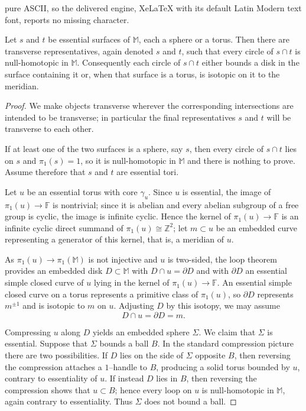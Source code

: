 \documentclass[10pt,a4paper]{amsart}
\newcommand{\FF}{\mathbb{F}}
\newcommand{\MM}{\mathbb{M}}
\newcommand{\ZZ}{\mathbb{Z}}
\begin{document}
pure ASCII, so the delivered engine, XeLaTeX with its default Latin Modern text font, reports no missing character.
\begin{lemma} \label{lem:circle_types}
    Let $s$ and $t$ be essential surfaces of $\MM$, each a sphere or a torus.
    Then there are transverse representatives, again denoted $s$ and $t$, such that every circle of $s \cap t$ is null-homotopic in $\MM$.
    Consequently each circle of $s \cap t$ either bounds a disk in the surface containing it or, when that surface is a torus, is isotopic on it to the meridian.
\end{lemma}

\begin{proof}
    We make objects transverse wherever the corresponding intersections are intended to be transverse; in particular the final representatives $s$ and $t$ will be transverse to each other.

    If at least one of the two surfaces is a sphere, say $s$, then every circle of $s \cap t$ lies on $s$ and $\pi_1(s) = 1$, so it is null-homotopic in $\MM$ and there is nothing to prove.
    Assume therefore that $s$ and $t$ are essential tori.

    Let $u$ be an essential torus with core $\gamma_u$.
    Since $u$ is essential, the image of $\pi_1(u) \to \FF$ is nontrivial; since it is abelian and every abelian subgroup of a free group is cyclic, the image is infinite cyclic.
    Hence the kernel of $\pi_1(u) \to \FF$ is an infinite cyclic direct summand of $\pi_1(u) \cong \ZZ^2$; let $m \subset u$ be an embedded curve representing a generator of this kernel, that is, a meridian of $u$.

    As $\pi_1(u) \to \pi_1(\MM)$ is not injective and $u$ is two-sided, the loop theorem provides an embedded disk $D \subset \MM$ with $D \cap u = \partial D$ and with $\partial D$ an essential simple closed curve of $u$ lying in the kernel of $\pi_1(u) \to \FF$.
    An essential simple closed curve on a torus represents a primitive class of $\pi_1(u)$, so $\partial D$ represents $m^{\pm 1}$ and is isotopic to $m$ on $u$.
    Adjusting $D$ by this isotopy, we may assume
    \[
        D \cap u = \partial D = m .
    \]

    Compressing $u$ along $D$ yields an embedded sphere $\Sigma$.
    We claim that $\Sigma$ is essential.
    Suppose that $\Sigma$ bounds a ball $B$.
    In the standard compression picture there are two possibilities.
    If $D$ lies on the side of $\Sigma$ opposite $B$, then reversing the compression attaches a $1$--handle to $B$, producing a solid torus bounded by $u$, contrary to essentiality of $u$.
    If instead $D$ lies in $B$, then reversing the compression shows that $u \subset B$; hence every loop on $u$ is null-homotopic in $\MM$, again contrary to essentiality.
    Thus $\Sigma$ does not bound a ball.


\end{proof}
\end{document}
